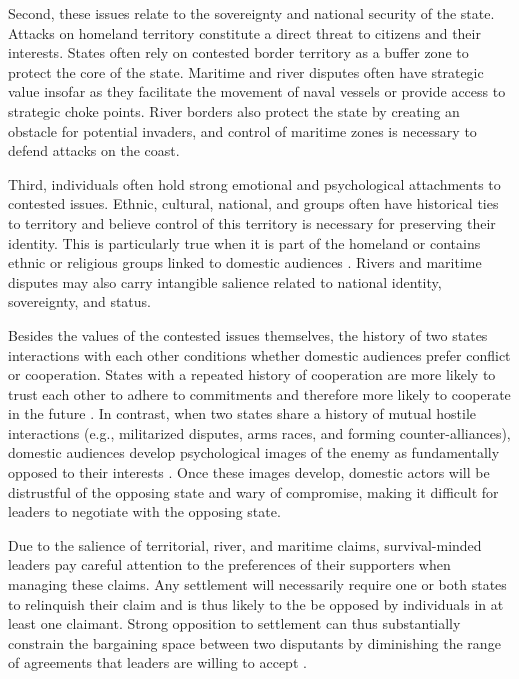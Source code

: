 Second, these issues relate to the sovereignty and national security of the state. Attacks on homeland territory constitute a direct threat to citizens and their interests. States often rely on contested border territory as a buffer zone to protect the core of the state. Maritime and river disputes often have strategic value insofar as they facilitate the movement of naval vessels or provide access to strategic choke points. River borders also protect the state by creating an obstacle for potential invaders, and control of maritime zones is necessary to defend attacks on the coast.

Third, individuals often hold strong emotional and psychological attachments to contested issues. Ethnic, cultural, national, and groups often have historical ties to territory and believe control of this territory is necessary for preserving their identity. This is particularly true when it is part of the homeland or contains ethnic or religious groups linked to domestic audiences \citep{gibler2012a, miller2013}. Rivers and maritime disputes may also carry intangible salience related to national identity, sovereignty, and status.


Besides the values of the contested issues themselves, the history of two states interactions with each other conditions whether domestic audiences prefer conflict or cooperation. States with a repeated history of cooperation are more likely to trust each other to adhere to commitments and therefore more likely to cooperate in the future \citep[e.g., ][]{axelrod1984}. In contrast, when two states share a history of mutual hostile interactions (e.g., militarized disputes, arms races, and forming counter-alliances), domestic audiences develop psychological images of the enemy as fundamentally opposed to their interests \citep{colaresi2007, senese2008, vasquez2009}. Once these images develop, domestic actors will be distrustful of the opposing state and wary of compromise, making it difficult for leaders to negotiate with the opposing state.



Due to the salience of territorial, river, and maritime claims, survival-minded leaders pay careful attention to the preferences of their supporters when managing these claims. Any settlement will necessarily require one or both states to relinquish their claim and is thus likely to the be opposed by individuals in at least one claimant. Strong opposition to settlement can thus substantially constrain the bargaining space between two disputants by diminishing the range of agreements that leaders are willing to accept \citep{fearon1994, putnam1988}. 

